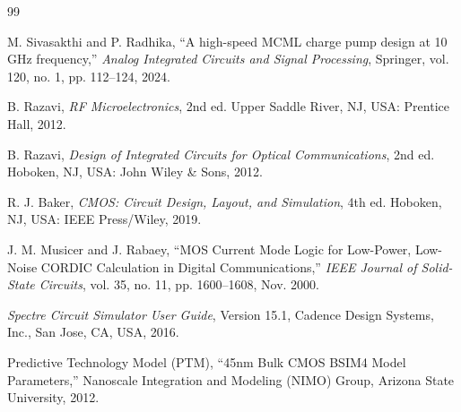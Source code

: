 \documentclass[11pt,a4paper]{report}
\begin{document}
\vspace{1.0cm}
\begin{thebibliography}{99}

M. Sivasakthi and P. Radhika, ``A high-speed MCML charge pump design at 10 GHz frequency,'' \textit{Analog Integrated Circuits and Signal Processing}, Springer, vol. 120, no. 1, pp. 112--124, 2024.

B. Razavi, \textit{RF Microelectronics}, 2nd ed. Upper Saddle River, NJ, USA: Prentice Hall, 2012.

B. Razavi, \textit{Design of Integrated Circuits for Optical Communications}, 2nd ed. Hoboken, NJ, USA: John Wiley \& Sons, 2012.

R. J. Baker, \textit{CMOS: Circuit Design, Layout, and Simulation}, 4th ed. Hoboken, NJ, USA: IEEE Press/Wiley, 2019.

J. M. Musicer and J. Rabaey, ``MOS Current Mode Logic for Low-Power, Low-Noise CORDIC Calculation in Digital Communications,'' \textit{IEEE Journal of Solid-State Circuits}, vol. 35, no. 11, pp. 1600--1608, Nov. 2000.

\textit{Spectre Circuit Simulator User Guide}, Version 15.1, Cadence Design Systems, Inc., San Jose, CA, USA, 2016.

Predictive Technology Model (PTM), ``45nm Bulk CMOS BSIM4 Model Parameters,'' Nanoscale Integration and Modeling (NIMO) Group, Arizona State University, 2012.

\end{thebibliography}
\end{document}
